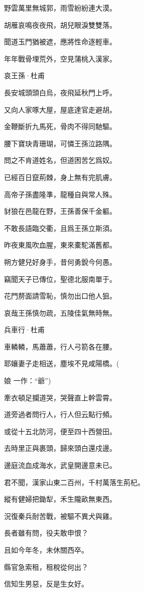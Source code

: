 \documentclass[12pt,a4paper]{ctexbook}
\begin{document}
野雲萬里無城郭，雨雪紛紛連大漠。\par
胡雁哀鳴夜夜飛，胡兒眼淚雙雙落。\par
聞道玉門猶被遮，應將性命逐輕車。\par
年年戰骨埋荒外，空見蒲桃入漢家。\par
哀王孫·杜甫\par
長安城頭頭白烏，夜飛延秋門上呼。\par
又向人家啄大屋，屋底達官走避胡。\par
金鞭斷折九馬死，骨肉不得同馳驅。\par
腰下寶玦青珊瑚，可憐王孫泣路隅。\par
問之不肯道姓名，但道困苦乞爲奴。\par
已經百日竄荊棘，身上無有完肌膚。\par
高帝子孫盡隆準，龍種自與常人殊。\par
豺狼在邑龍在野，王孫善保千金軀。\par
不敢長語臨交衢，且爲王孫立斯須。\par
昨夜東風吹血腥，東來橐駝滿舊都。\par
朔方健兒好身手，昔何勇銳今何愚。\par
竊聞天子已傳位，聖德北服南單于。\par
花門剺面請雪恥，慎勿出口他人狙。\par
哀哉王孫慎勿疏，五陵佳氣無時無。\par
兵車行·杜甫\par
車轔轔，馬蕭蕭，行人弓箭各在腰。\par
耶孃妻子走相送，塵埃不見咸陽橋。(\par
娘 一作：“爺”)\par
牽衣頓足攔道哭，哭聲直上幹雲霄。\par
道旁過者問行人，行人但云點行頻。\par
或從十五北防河，便至四十西營田。\par
去時里正與裹頭，歸來頭白還戍邊。\par
邊庭流血成海水，武皇開邊意未已。\par
君不聞，漢家山東二百州，千村萬落生荊杞。\par
縱有健婦把鋤犁，禾生隴畝無東西。\par
況復秦兵耐苦戰，被驅不異犬與雞。\par
長者雖有問，役夫敢申恨？\par
且如今年冬，未休關西卒。\par
縣官急索租，租稅從何出？\par
信知生男惡，反是生女好。\par
\end{document}
